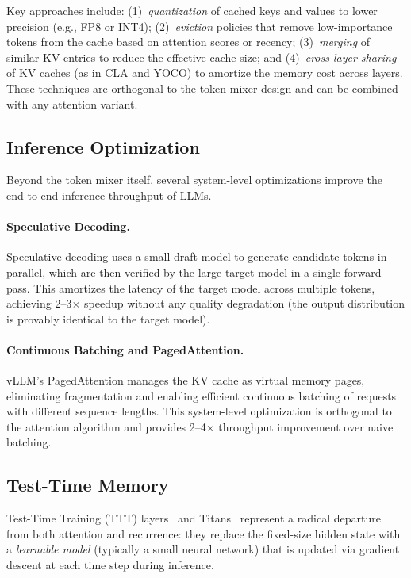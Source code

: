 Key approaches include: (1)~\emph{quantization} of cached keys and values to lower precision (e.g., FP8 or INT4); (2)~\emph{eviction} policies that remove low-importance tokens from the cache based on attention scores or recency; (3)~\emph{merging} of similar KV entries to reduce the effective cache size; and (4)~\emph{cross-layer sharing} of KV caches (as in CLA and YOCO) to amortize the memory cost across layers. These techniques are orthogonal to the token mixer design and can be combined with any attention variant.

\subsection{Inference Optimization}
\label{subsec:inference-opt}

Beyond the token mixer itself, several system-level optimizations improve the end-to-end inference throughput of LLMs.

\paragraph{Speculative Decoding.}
Speculative decoding uses a small draft model to generate candidate tokens in parallel, which are then verified by the large target model in a single forward pass. This amortizes the latency of the target model across multiple tokens, achieving 2--3$\times$ speedup without any quality degradation (the output distribution is provably identical to the target model).

\paragraph{Continuous Batching and PagedAttention.}
vLLM's PagedAttention manages the KV cache as virtual memory pages, eliminating fragmentation and enabling efficient continuous batching of requests with different sequence lengths. This system-level optimization is orthogonal to the attention algorithm and provides 2--4$\times$ throughput improvement over naive batching.

\subsection{Test-Time Memory}
\label{subsec:ttm}

Test-Time Training (TTT) layers~\cite{sun2024learning} and Titans~\cite{behrouz2024titans} represent a radical departure from both attention and recurrence: they replace the fixed-size hidden state with a \emph{learnable model} (typically a small neural network) that is updated via gradient descent at each time step during inference.

